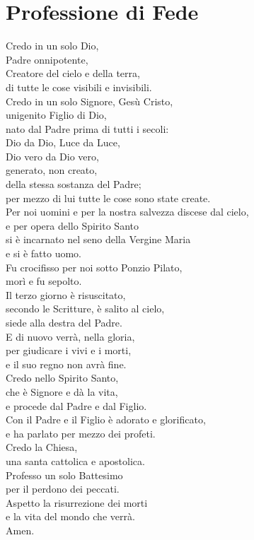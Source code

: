 
\section*{Professione di Fede}

\begin{dialoghi}
	\item[\tutti] Credo in un solo Dio,\\
	Padre onnipotente,\\
	Creatore del cielo e della terra,\\
	di tutte le cose visibili e invisibili.\\
	Credo in un solo Signore, Gesù Cristo,\\
	unigenito Figlio di Dio,\\
	nato dal Padre prima di tutti i secoli:\\
	Dio da Dio, Luce da Luce,\\
	Dio vero da Dio vero,\\
	generato, non creato,\\
	della stessa sostanza del Padre;\\
	per mezzo di lui tutte le cose sono state create.\\
	Per noi uomini e per la nostra salvezza discese dal cielo,\\
	e per opera dello Spirito Santo\\
	si è incarnato nel seno della Vergine Maria\\
	e si è fatto uomo.\\
	Fu crocifisso per noi sotto Ponzio Pilato,\\
	morì e fu sepolto.\\
	Il terzo giorno è risuscitato,\\
	secondo le Scritture, è salito al cielo,\\
	siede alla destra del Padre.\\
	E di nuovo verrà, nella gloria,\\
	per giudicare i vivi e i morti,\\
	e il suo regno non avrà fine.\\
	Credo nello Spirito Santo,\\
	che è Signore e dà la vita,\\
	e procede dal Padre e dal Figlio.\\
	Con il Padre e il Figlio è adorato e glorificato,\\
	e ha parlato per mezzo dei profeti.\\
	Credo la Chiesa,\\
	una santa cattolica e apostolica.\\
	Professo un solo Battesimo\\
	per il perdono dei peccati.\\
	Aspetto la risurrezione dei morti\\
	e la vita del mondo che verrà.\\
	Amen.
\end{dialoghi}

\newpage